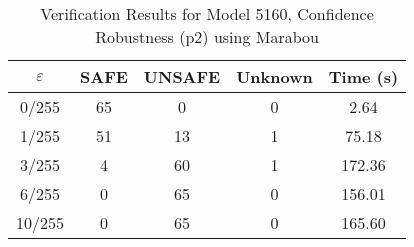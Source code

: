 \begin{table}[htbp]
\centering
\caption{Verification Results for Model 5160, Confidence Robustness (p2) using Marabou}
\label{tab:model5160_p2_marabou}
\begin{tabular}{|c|c|c|c|c|}
\hline
$\varepsilon$ & SAFE & UNSAFE & Unknown & Time (s) \\ \hline
0/255 & 65 & 0 & 0 & 2.64 \\ \hline
1/255 & 51 & 13 & 1 & 75.18 \\ \hline
3/255 & 4 & 60 & 1 & 172.36 \\ \hline
6/255 & 0 & 65 & 0 & 156.01 \\ \hline
10/255 & 0 & 65 & 0 & 165.60 \\ \hline
\end{tabular}
\end{table}
